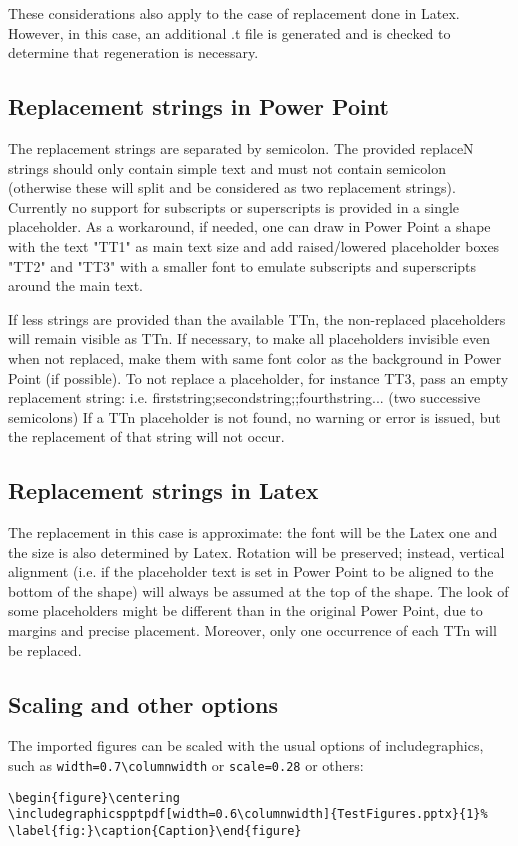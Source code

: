 \documentclass[10pt,,a4paper]{article}
\begin{document}
These considerations also apply to the case of replacement done in Latex. 
However, in this case, an additional .t file is generated and is checked to determine that regeneration is necessary.


\subsection{Replacement strings in Power Point}
The replacement strings are separated by semicolon.
The provided replaceN strings should only contain simple text and must not contain semicolon (otherwise these will split and be considered as two replacement strings).
Currently no support for subscripts or superscripts is provided in a single placeholder.
As a workaround, if needed, one can draw in Power Point a shape with the text "TT1" as main text size and add raised/lowered placeholder boxes "TT2" and "TT3" with a smaller font to emulate subscripts and superscripts around the main text.

If less strings are provided than the available TTn, the non-replaced placeholders will remain visible as TTn.
If necessary, to make all placeholders invisible even when not replaced, make them with same font color as the background in Power Point (if possible).
To not replace a placeholder, for instance TT3, pass an empty replacement string: i.e. firststring;secondstring;;fourthstring... (two successive semicolons)
If a TTn placeholder is not found, no warning or error is issued, but the replacement of that string will not occur.


\subsection{Replacement strings in Latex}
The replacement in this case is approximate: the font will be the Latex one and the size is also determined by Latex.
Rotation will be preserved;
instead, vertical alignment (i.e. if the placeholder text is set in Power Point to be aligned to the bottom of the shape) will always be assumed at the top of the shape.
The look of some placeholders might be different than in the original Power Point, due to margins and precise placement.
Moreover, only one occurrence of each TTn will be replaced.


\subsection{Scaling and other options}
The imported figures can be scaled with the usual options of includegraphics, such as \verb!width=0.7\columnwidth! or \verb!scale=0.28! or others:
\begin{small}
\begin{verbatim}
\begin{figure}\centering
\includegraphicspptpdf[width=0.6\columnwidth]{TestFigures.pptx}{1}%
\label{fig:}\caption{Caption}\end{figure}
\end{verbatim}
\end{small}
\end{document}
